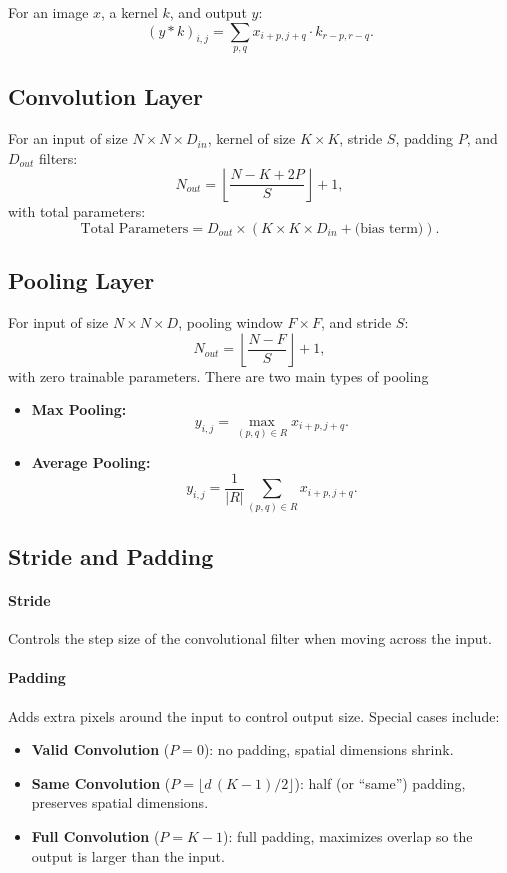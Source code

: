 \documentclass{article}
\begin{document}
For an image \(x\), a kernel \(k\), and output \(y\):
\[
(y * k)_{i,j} = \sum_{p,q} x_{i+p,j+q} \cdot k_{r-p, r-q}.
\]

\subsection{Convolution Layer}
For an input of size \(N \times N \times D_{in}\), kernel of size \(K \times K\), stride \(S\), padding \(P\), and \(D_{out}\) filters:
\[
N_{out} = \left\lfloor \frac{N - K + 2P}{S} \right\rfloor + 1,
\]
with total parameters:
\[
\text{Total Parameters} = D_{out} \times \left( K \times K \times D_{in} + \text{(bias term)} \right).
\]

\subsection{Pooling Layer}
For input of size \(N \times N \times D\), pooling window \(F \times F\), and stride \(S\):
\[
N_{out} = \left\lfloor \frac{N - F}{S} \right\rfloor + 1,
\]
with zero trainable parameters. There are two main types of pooling

\begin{itemize}
    \item \textbf{Max Pooling:}
    \[
    y_{i,j} = \max_{(p,q) \in R} x_{i+p, j+q}.
    \]
    \item \textbf{Average Pooling:}
    \[
    y_{i,j} = \frac{1}{|R|} \sum_{(p,q) \in R} x_{i+p, j+q}.
    \]
\end{itemize}


\subsection{Stride and Padding}
\paragraph{Stride} Controls the step size of the convolutional filter when moving across the input.

\paragraph{Padding} Adds extra pixels around the input to control output size. Special cases include:
\begin{itemize}
    \item \textbf{Valid Convolution} ($P=0$): no padding, spatial dimensions shrink.
    \item \textbf{Same Convolution} ($P=\lfloor d\,(K-1)/2\rfloor$): half (or “same”) padding, preserves spatial dimensions.
    \item \textbf{Full Convolution} ($P=K-1$): full padding, maximizes overlap so the output is larger than the input.
\end{itemize}
\end{document}
